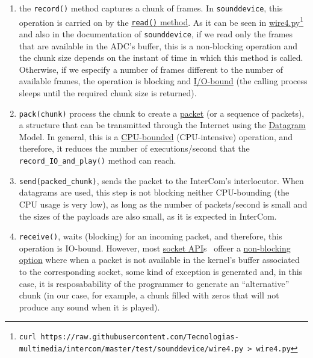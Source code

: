 \begin{enumerate}
\item the \verb|record()| method captures a chunk of frames. In
  \verb|sounddevice|, this operation is carried on by the
  \href{https://python-sounddevice.readthedocs.io/en/0.4.0/api/streams.html#sounddevice.Stream.read}{\texttt{read()}
    method}. As it can be seen in
  \href{https://raw.githubusercontent.com/Tecnologias-multimedia/intercom/master/test/sounddevice/wire4.py}{wire4.py}\footnote{
  \texttt{curl
    https://raw.githubusercontent.com/Tecnologias-multimedia/intercom/master/test/sounddevice/wire4.py
    > wire4.py}} and also in the documentation of
  \verb|sounddevice|, if we read only the frames that are available
  in the ADC's buffer, this is a non-blocking operation and the chunk
  size depends on the instant of time in which this method is
  called. Otherwise, if we especify a number of frames different to
  the number of available frames, the operation is blocking and
  \href{https://en.wikipedia.org/wiki/I/O_bound}{I/O-bound} (the
  calling process sleeps until the required chunk size is returned).

\item \verb|pack(chunk)| process the chunk to create a
  \href{https://en.wikipedia.org/wiki/Network_packet}{packet} (or a
  sequence of packets), a structure that can be transmitted through
  the Internet using the
  \href{https://en.wikipedia.org/wiki/Datagram}{Datagram} Model. In
  general, this is a
  \href{https://en.wikipedia.org/wiki/CPU-bound}{CPU-bounded}
  (CPU-intensive) operation, and therefore, it reduces the number of
  executions/second that the \verb|record_IO_and_play()| method can
  reach.

\item \verb|send(packed_chunk)|, sends the packet to the
  InterCom's interlocutor. When datagrams are used, this step is
  not blocking neither CPU-bounding (the CPU usage is very low), as
  long as the number of packets/second is small and the sizes of the
  payloads are also small, as it is expected in InterCom.

\item \verb|receive()|, waits (blocking) for an incoming packet, and
  therefore, this operation is IO-bound. However, most
  \href{https://docs.python.org/3/library/socket.html}{socket
    API}s~\cite{python} offeer a
  \href{https://docs.python.org/3.8/library/socket.html#socket.socket.setblocking}{non-blocking
    option} where when a packet is not available in the kernel's
  buffer associated to the corresponding socket, some kind of
  exception is generated and, in this case, it is resposabability of
  the programmer to generate an ``alternative'' chunk (in our case,
  for example, a chunk filled with zeros that will not produce any
  sound when it is played).


\end{enumerate}
